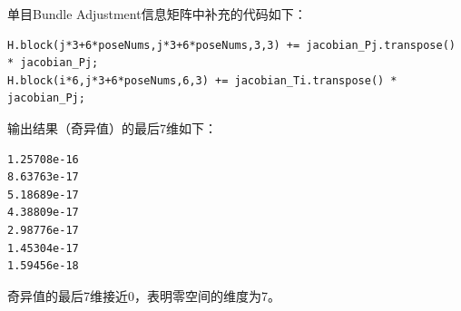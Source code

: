 \documentclass[12pt,a4paper]{article}
\begin{document}
单目Bundle Adjustment信息矩阵中补充的代码如下：

\begin{lstlisting}
H.block(j*3+6*poseNums,j*3+6*poseNums,3,3) += jacobian_Pj.transpose() * jacobian_Pj;
H.block(i*6,j*3+6*poseNums,6,3) += jacobian_Ti.transpose() * jacobian_Pj;
\end{lstlisting}

输出结果（奇异值）的最后7维如下：

\begin{lstlisting}
1.25708e-16
8.63763e-17
5.18689e-17
4.38809e-17
2.98776e-17
1.45304e-17
1.59456e-18
\end{lstlisting}

奇异值的最后7维接近0，表明零空间的维度为7。



\end{document}
